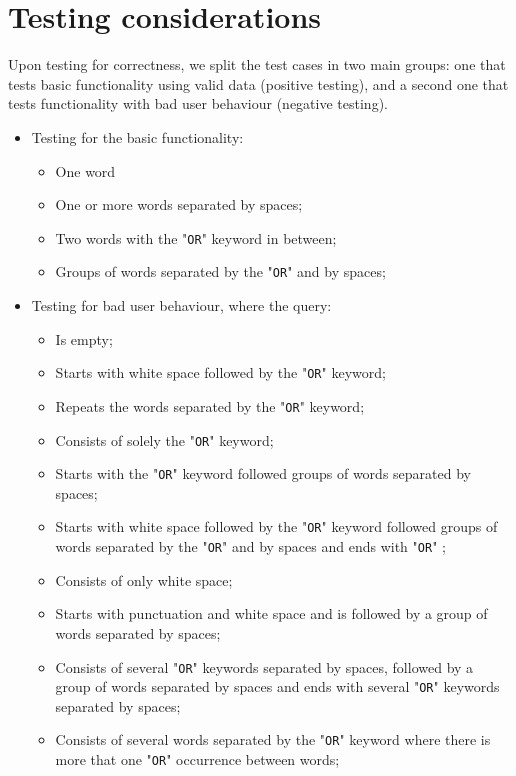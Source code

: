 \section{Testing considerations} %
Upon testing for correctness, we split the test cases in two main groups: one that tests basic functionality using valid data (positive testing), and a second one that tests functionality with bad user behaviour (negative testing).
\begin{itemize}
    \item Testing for the basic functionality:
        \begin{itemize}
            \item One word
            \item One or more words separated by spaces;
            \item Two words with the "{\tt OR}" keyword in between;
            \item Groups of words separated by the "{\tt OR}" and by spaces;
        \end{itemize}
    \item Testing for bad user behaviour, where the query:
    \begin{itemize}
        \item Is empty;
        \item Starts with white space followed by the "{\tt OR}" keyword;
        \item Repeats the words separated by the "{\tt OR}" keyword;
        \item Consists of solely the "{\tt OR}" keyword;
        \item Starts with the "{\tt OR}" keyword followed groups of words separated by spaces;
        \item Starts with white space followed by the "{\tt OR}" keyword followed groups of words separated by the "{\tt OR}" and by spaces and ends with "{\tt OR}" ;
        \item Consists of only white space;
        \item Starts with punctuation and white space and is followed by a group of words separated by spaces;
        \item Consists of several "{\tt OR}" keywords separated by spaces, followed by a group of words separated by spaces and ends with several "{\tt OR}" keywords separated by spaces;
        \item Consists of several words separated by the "{\tt OR}" keyword where there is more that one "{\tt OR}" occurrence between words;

\end{itemize}
\end{itemize}
